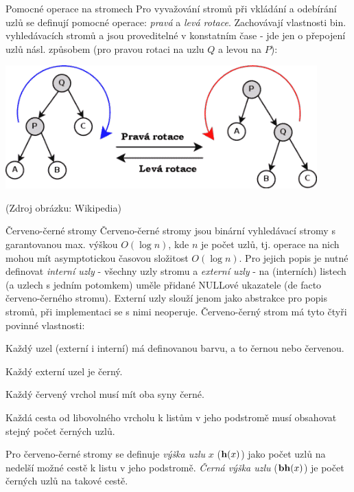 \begin{definiceN}{Pomocné operace na stromech}
Pro vyvažování stromů při vkládání a odebírání uzlů se definují pomocné operace: \emph{pravá} a \emph{levá rotace}. Zachovávají vlastnosti bin. vyhledávacích stromů a jsou proveditelné v konstatním čase - jde jen o přepojení uzlů násl. způsobem (pro pravou rotaci na uzlu $Q$ a levou na $P$):

\begin{center}
\includegraphics[width=12cm]{informatika/algoritmy_a_ds/obrazky/tree_rotation.png}

(Zdroj obrázku: Wikipedia)
\end{center}
\end{definiceN}


\begin{definiceN}{Červeno-černé stromy}
Červeno-černé stromy jsou binární vyhledávací stromy s garantovanou max. výškou $O(\log n)$, kde $n$ je počet uzlů, tj. operace na nich mohou mít asymptotickou časovou složitost $O(\log n)$. Pro jejich popis je nutné definovat \emph{interní uzly} - všechny uzly stromu a \emph{externí uzly} - na (interních) listech (a uzlech s jedním potomkem) uměle přidané NULLové ukazatele (de facto  červeno-černého stromu). Externí uzly slouží jenom jako abstrakce pro popis stromů, při implementaci se s nimi neoperuje. Červeno-černý strom má tyto čtyři povinné vlastnosti:
\begin{penumerate}
    \item Každý uzel (externí i interní) má definovanou barvu, a to černou nebo červenou.
    \item Každý externí uzel je černý.
    \item Každý červený vrchol musí mít oba syny černé.
    \item Každá cesta od libovolného vrcholu k listům v jeho podstromě musí obsahovat stejný počet černých uzlů.
\end{penumerate}

Pro červeno-černé stromy se definuje \emph{výška uzlu} $x$ ($\mathbf{h}(x)$) jako počet uzlů na nedelší možné cestě k listu v jeho podstromě. \emph{Černá výška uzlu} ($\mathbf{bh}(x)$) je počet černých uzlů na takové cestě.
\end{definiceN}

